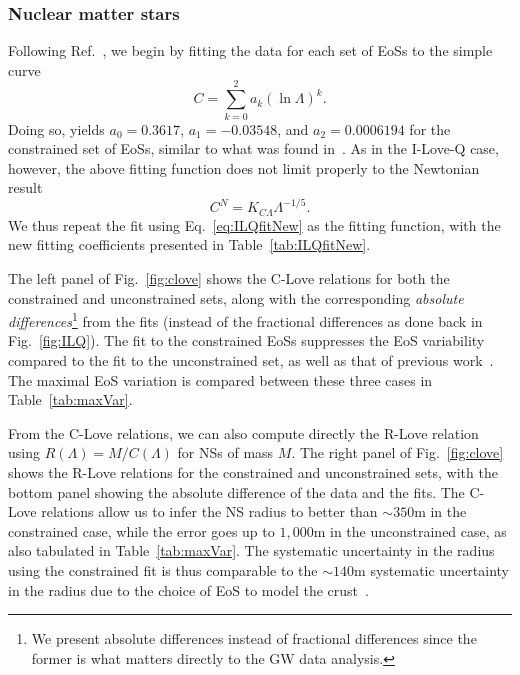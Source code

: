 \documentclass[prd,twocolumn,nofootinbib,superscriptaddress,amsmath,amssymb]{revtex4-1}
\begin{document}
\subsubsection{Nuclear matter stars}
\label{sec:clove-nuc}

Following Ref.~\cite{Maselli:2013mva}, we begin by fitting the data for each set of EoSs to the simple curve
\begin{equation}
C = \sum^2_{k=0} a_k (\ln{\Lambda})^k.
\end{equation}
Doing so, yields $a_0 = 0.3617$, $a_1 = -0.03548$, and $a_2 = 0.0006194$ for the constrained set of EoSs, similar to what was found in~\cite{Maselli:2013mva}. As in the I-Love-Q case, however, the above fitting function does not limit properly to the Newtonian result 
\begin{equation}
C^N=K_{C\Lambda}\Lambda^{-1/5}.\label{eq:cloveFit}
\end{equation}
We thus repeat the fit using Eq.~\eqref{eq:ILQfitNew} as the fitting function, with the new fitting coefficients presented in Table~\ref{tab:ILQfitNew}.

The left panel of Fig.~\ref{fig:clove} shows the C-Love relations for both the constrained and unconstrained sets, along with the corresponding \emph{absolute differences}\footnote{We present absolute differences instead of fractional differences since the former is what matters directly to the GW data analysis.} from the fits (instead of the fractional differences as done back in Fig.~\ref{fig:ILQ}). The fit to the constrained EoSs suppresses the EoS variability compared to the fit to the unconstrained set, as well as that of previous work~\cite{Maselli:2013mva}. The maximal EoS variation is compared between these three cases in Table~\ref{tab:maxVar}.

From the C-Love relations, we can also compute directly the R-Love relation using $R(\Lambda)=M/C(\Lambda)$ for NSs of mass $M$. The right panel of Fig.~\ref{fig:clove} shows the R-Love relations for the constrained and unconstrained sets, with the bottom panel showing the absolute difference of the data and the fits. The C-Love relations allow us to infer the NS radius to better than $\sim 350 \textrm{m} $ in the constrained case, while the error goes up to $1,000 \textrm{m}$ in the unconstrained case, as also tabulated in Table~\ref{tab:maxVar}. The systematic uncertainty in the radius using the constrained fit is thus comparable to the $\sim 140\textrm{m}$ systematic uncertainty in the radius due to the choice of EoS to model the crust~\cite{Gamba:2019kwu}. 
\end{document}
